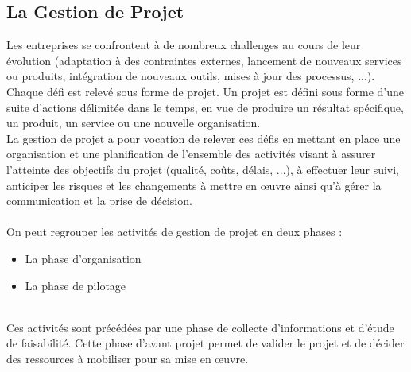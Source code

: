 \begin{spacing}{1.5}
\section{La Gestion de Projet}
Les entreprises se confrontent à de nombreux challenges au cours de leur évolution (adaptation à des contraintes externes, lancement de nouveaux services ou produits, intégration de nouveaux outils, mises à jour des processus, ...). Chaque défi est relevé sous forme de projet. Un projet est défini sous forme d'une suite d'actions délimitée dans le temps, en vue de produire un résultat spécifique, un produit, un service ou une nouvelle organisation.\\
La gestion de projet a pour vocation de relever ces défis en mettant en place une organisation et une planification de l’ensemble des activités visant à assurer l’atteinte des objectifs du projet (qualité, coûts, délais, ...), à effectuer leur suivi, anticiper les risques et les changements à mettre en œuvre  ainsi qu'à gérer la communication et la prise de décision.\\
\\
On peut regrouper les activités de gestion de projet en deux phases :
\begin{itemize}
    \item La phase d'organisation
    \item La phase de pilotage
\end{itemize}
\\
Ces activités sont précédées par une phase de collecte d'informations et d'étude de faisabilité. Cette phase d'avant projet permet de valider le projet et de décider des ressources à mobiliser pour sa mise en œuvre.

\end{spacing}
